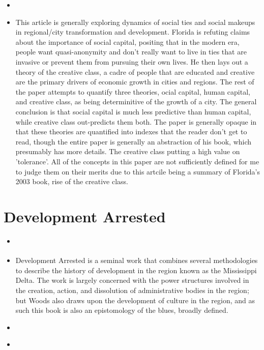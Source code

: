 \documentclass{article}
\begin{document}
\begin{itemize}
\item \cite{florida2003CitiesCreative}
\item This article is generally exploring dynamics of social ties and social makeups in regional/city transformation and development. Florida is refuting claims about the importance of social capital, positing that in the modern era, people want quasi-anonymity and don't really want to live in ties that are invasive or prevent them from pursuing their own lives. He then lays out a theory of the creative class, a cadre of people that are educated and creative are the primary drivers of economic growth in cities and regions. The rest of the paper attempts to quantify three theories, ocial capital, human capital, and creative class, as being determinitive of the growth of a city. The general conclusion is that social capital is much less predictive than human capital, while creative class out-predicts them both. The paper is generally opaque in that these theories are quantified into indexes that the reader don't get to read, though the entire paper is generally an abstraction of his book, which presumably has more details. The creative class putting a high value on 'tolerance'. All of the concepts in this paper are not sufficiently defined for me to judge them on their merits due to this artcile being a summary of Florida's 2003 book, rise of the creative class. 
  
\end{itemize}
\section{Development Arrested}
\begin{itemize}
\item \cite{woods2017DevelopmentArrested}
\item Development Arrested is a seminal work that combines several methodologies to describe the history of development in the region known as the Mississippi Delta. The work is largely concerned with the power structures involved in the creation, action, and dissolution of administrative bodies in the region; but Woods also draws upon the development of culture in the region, and as such this book is also an epistomology of the blues, broadly defined.

\item \cite{isenberg2004SymposiumWoods}

\item \cite{tiefenbacher2019DevelopmentArrested}
\end{itemize}



\end{document}
